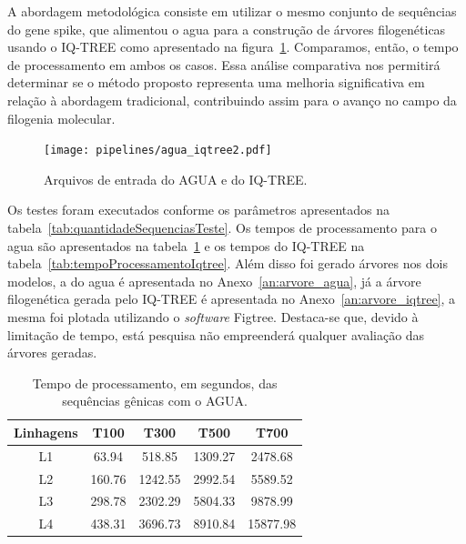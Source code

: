 A abordagem metodológica consiste em utilizar o mesmo conjunto de sequências do gene spike, que alimentou o \gls{agua} para a construção de árvores filogenéticas usando o IQ-TREE como apresentado na figura~\ref{fig:inputAguaIqtree}. Comparamos, então, o tempo de processamento em ambos os casos. Essa análise comparativa nos permitirá determinar se o método proposto representa uma melhoria significativa em relação à abordagem tradicional, contribuindo assim para o avanço no campo da filogenia molecular.
\begin{figure}[htb]
  \centering
  \caption{Arquivos de entrada do AGUA e do IQ-TREE.}
  \texttt{[image: pipelines/agua\_iqtree2.pdf]}
  ~\label{fig:inputAguaIqtree}
\end{figure}

Os testes foram executados conforme os parâmetros apresentados na tabela~\ref{tab:quantidadeSequenciasTeste}. Os tempos de processamento para o \gls{agua} são apresentados na tabela~\ref{tab:tempoProcessamentoAgua} e os tempos do IQ-TREE na tabela~\ref{tab:tempoProcessamentoIqtree}. Além disso foi gerado árvores nos dois modelos, a do \gls{agua} é apresentada no Anexo~\ref{an:arvore_agua}, já a árvore filogenética gerada pelo IQ-TREE é apresentada no Anexo~\ref{an:arvore_iqtree}, a mesma foi plotada utilizando o \textit{software} Figtree. Destaca-se que, devido à limitação de tempo, está pesquisa não empreenderá qualquer avaliação das árvores geradas.

\begin{table}[htb]
  \caption{Tempo de processamento, em segundos, das sequências gênicas com o AGUA.}
  \begin{center}
    \begin{tabular}{c|c|c|c|c}
      \hline
      Linhagens & T100   & T300    & T500    & T700     \\
      \hline
      L1        & 63.94  & 518.85  & 1309.27 & 2478.68  \\
      L2        & 160.76 & 1242.55 & 2992.54 & 5589.52  \\
      L3        & 298.78 & 2302.29 & 5804.33 & 9878.99  \\
      L4        & 438.31 & 3696.73 & 8910.84 & 15877.98 \\
      \hline
    \end{tabular}
  \end{center}
  \label{tab:tempoProcessamentoAgua}
\end{table}

